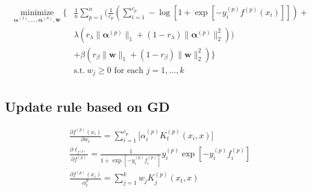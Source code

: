 \documentclass[a4paper]{article}
\DeclareMathOperator{\minimize}{minimize}
\begin{document}
\begin{align}
  \begin{split}
    \underset{\bm{\alpha}^{(1)}, \dots, \bm{\alpha}^{(n)}, \bm{w}}{\minimize}
    \bigg\{ & \frac{1}{n}\sum_{p=1}^n  \Bigg( \frac{1}{c_p}\left(\sum_{i=1}^{c_p} - \log\left[1 + \exp\left[-y_i^{(p)}f^{(p)}(x_i)\right]\right] \right)+\\
    &\lambda  \left(r_\lambda \|\bm{\alpha}^{(p)}\|_1+(1-r_\lambda)\|\bm{\alpha}^{(p)}\|_2^2\right) \Bigg)\\
    &+ \beta \left(r_\beta  \|\bm{w}\|_1 + (1-r_\beta)\|\bm{w}\|^2_2\right) \bigg\}\\
    & \text{s.t.}\ w_j \geq 0 \text{ for each } j=1,\dots,k
  \end{split}
\end{align}

\subsection{Update rule based on GD}
\begin{align}
  & \frac{\partial f^{(p)}(x_i)}{\partial w_t} =  \sum_{i=1}^{c_p}\Big[\alpha_i^{(p)} K_t^{(p)}(x_i, x)\Big] \\
  & \frac{\partial \ell_{f^{(p)}}}{\partial f^{(p)}} = \frac{1}{1+\exp\left[-y_i^{(p)}f^{(p)}_i\right]} y_i^{(p)}\exp\left[-y_i^{(p)}f^{(p)}_i\right] \\
  & \frac{\partial {f^{(p)}}(x_i) }{\alpha_t^{p}} = \sum_{j=1}^k w_j K_j^{(p)}(x_t, x)
\end{align}
\end{document}
